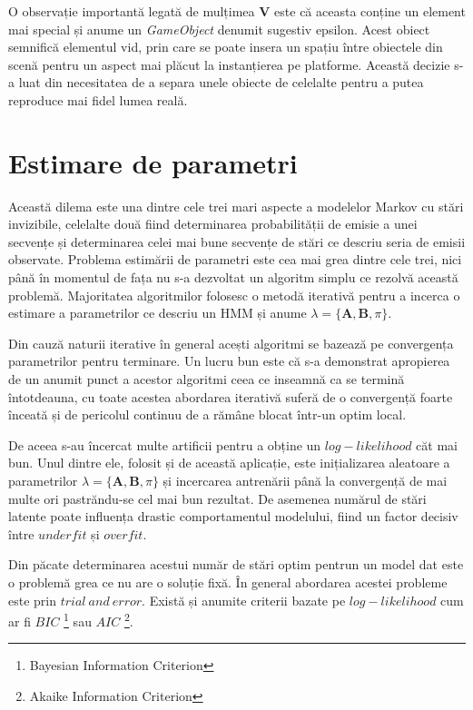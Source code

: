 O observație importantă legată de mulțimea \textbf{V} este că aceasta conține un element mai special și anume un \textit{GameObject} denumit sugestiv epsilon. Acest obiect semnifică elementul vid, prin care se poate insera un spațiu între obiectele din scenă pentru un aspect mai plăcut la instanțierea pe platforme. Această decizie s-a luat din necesitatea de a separa unele obiecte de celelalte pentru a putea reproduce mai fidel lumea reală.\par

\section{Estimare de parametri}

Această dilema este una dintre cele trei mari aspecte a modelelor Markov cu stări invizibile, celelalte două fiind determinarea probabilității de emisie a unei secvențe și determinarea celei mai bune secvențe de stări ce descriu seria de emisii observate. Problema estimării de parametri este cea mai grea dintre cele trei, nici până în momentul de fața nu s-a dezvoltat un algoritm simplu ce rezolvă această problemă. Majoritatea algoritmilor folosesc o metodă iterativă pentru a incerca o estimare a parametrilor ce descriu un HMM și anume $\lambda = \{\textbf{A},\textbf{B},\pi\}$.\par

Din cauză naturii iterative în general acești algoritmi se bazează pe convergența parametrilor pentru terminare. Un lucru bun este că s-a demonstrat apropierea de un anumit punct a acestor algoritmi ceea ce inseamnă ca se termină întotdeauna, cu toate acestea abordarea iterativă suferă de o convergență foarte înceată și de pericolul continuu de a rămâne blocat într-un optim local.\par

De aceea s-au încercat multe artificii pentru a obține un $log-likelihood$ căt mai bun. Unul dintre ele, folosit și de această aplicație, este inițializarea aleatoare a parametrilor $\lambda = \{\textbf{A},\textbf{B},\pi\}$ și incercarea antrenării până la convergență de mai multe ori pastrăndu-se cel mai bun rezultat. De asemenea numărul de stări latente poate influența drastic comportamentul modelului, fiind un factor decisiv între $underfit$ și $overfit$.\par

Din păcate determinarea acestui număr de stări optim pentrun un model dat este o problemă grea ce nu are o soluție fixă. În general abordarea acestei probleme este prin $trial\ and\ error$. Există și anumite criterii bazate pe $log-likelihood$ cum ar fi $BIC$ \footnote{Bayesian Information Criterion} sau $AIC$ \footnote{Akaike Information Criterion}.\par

